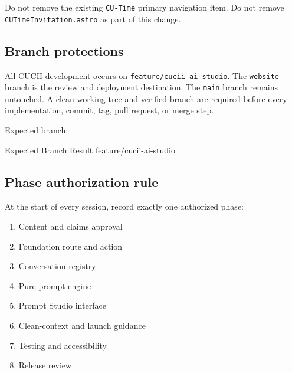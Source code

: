 \documentclass[11pt,letterpaper]{article}
\newcommand{\filepath}[1]{\texttt{#1}}
\newcommand{\branchname}[1]{\texttt{#1}}
\begin{document}
Do not remove the existing \texttt{CU-Time} primary navigation item. Do not remove
\filepath{CUTimeInvitation.astro} as part of this change.

\subsection{Branch protections}

\begin{safetybox}
All CUCII development occurs on \branchname{feature/cucii-ai-studio}. The
\branchname{website} branch is the review and deployment destination. The
\branchname{main} branch remains untouched. A clean working tree and verified
branch are required before every implementation, commit, tag, pull request, or
merge step.
\end{safetybox}


Expected branch:

\begin{codebox}{Expected Branch Result}
feature/cucii-ai-studio
\end{codebox}

\subsection{Phase authorization rule}

At the start of every session, record exactly one authorized phase:

\begin{enumerate}
    \item Content and claims approval
    \item Foundation route and action
    \item Conversation registry
    \item Pure prompt engine
    \item Prompt Studio interface
    \item Clean-context and launch guidance
    \item Testing and accessibility
    \item Release review
\end{enumerate}
\end{document}
